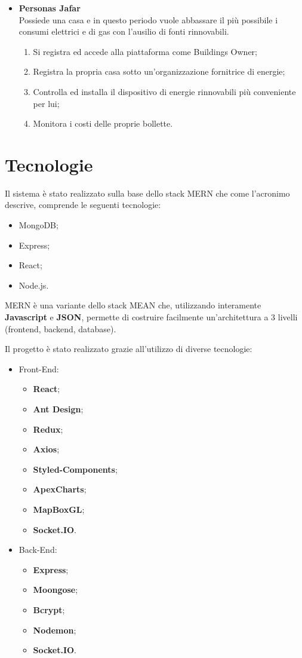 \documentclass{report}
\begin{document}
\begin{itemize}
\item \textbf{Personas Jafar}
\\ Possiede una casa e in questo periodo vuole abbassare il più possibile i consumi elettrici e di gas con l'ausilio di fonti rinnovabili.
\begin{enumerate}
\item Si registra ed accede alla piattaforma come Buildings Owner;
\item Registra la propria casa sotto un'organizzazione fornitrice di energie;
\item Controlla ed installa il dispositivo di energie rinnovabili più conveniente per lui;
\item Monitora i costi delle proprie bollette.
\end{enumerate}
\end{itemize}
\chapter{Tecnologie}
Il sistema è stato realizzato sulla base dello stack MERN che come l’acronimo descrive, comprende le seguenti tecnologie:
\begin{itemize}
\item MongoDB; 
\item Express;
\item React;
\item Node.js.
\end{itemize}

MERN è una variante dello stack MEAN che, utilizzando interamente \textbf{Javascript} e \textbf{JSON}, permette di costruire facilmente un’architettura a 3 livelli (frontend, backend, database).

Il progetto è stato realizzato grazie all'utilizzo di diverse tecnologie: 
\begin{itemize}
\item Front-End:
\begin{itemize}
\item \textbf{React};
\item \textbf{Ant Design};
\item \textbf{Redux};
\item \textbf{Axios};
\item \textbf{Styled-Components};
\item \textbf{ApexCharts};
\item \textbf{MapBoxGL};
\item \textbf{Socket.IO}.
\end{itemize}
\item Back-End:
\begin{itemize}
\item \textbf{Express};
\item \textbf{Moongose};
\item \textbf{Bcrypt};
\item \textbf{Nodemon};
\item \textbf{Socket.IO}.
\end{itemize}
\end{itemize}
\end{document}

